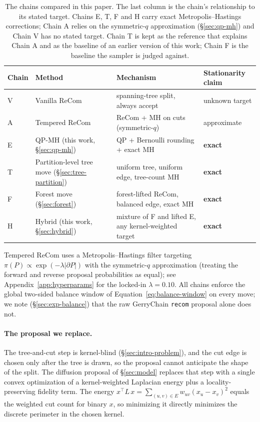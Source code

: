 \documentclass[11pt]{article}
\begin{document}
\begin{table}[htbp]
\centering
\footnotesize
\begin{tabular}{llll}
\toprule
Chain & Method & Mechanism & Stationarity claim \\
\midrule
V & Vanilla ReCom~\cite{deford2021recombination} & spanning-tree split, always accept & unknown target \\
A & Tempered ReCom & ReCom + MH on cuts (symmetric-$q$) & approximate \\
E & QP-MH (this work, \S\ref{sec:qp-mh}) & QP + Bernoulli rounding + exact MH & \textbf{exact} \\
T & Partition-level tree move (\S\ref{sec:tree-partition}) & uniform tree, uniform edge, tree-count MH & \textbf{exact} \\
F & Forest move (\S\ref{sec:forest}) & forest-lifted ReCom, balanced edge, exact MH & \textbf{exact} \\
H & Hybrid (this work, \S\ref{sec:hybrid}) & mixture of F and lifted E, any kernel-weighted target & \textbf{exact} \\
\bottomrule
\end{tabular}
\caption{The chains compared in this paper. The last column is the
  chain's relationship to its stated target. Chains E, T, F and H carry
  exact Metropolis--Hastings corrections; Chain A relies on the
  symmetric-$q$ approximation (\S\ref{sec:qp-mh}) and Chain V has
  no stated target. Chain T is kept as the reference that explains
  Chain A and as the baseline of an earlier version of this work;
  Chain F is the baseline the sampler is judged against.}
\label{tab:chains}
\end{table}

Tempered ReCom uses a Metropolis--Hastings filter targeting
$\pi(P) \propto \exp(-\lambda |\partial P|)$ with the symmetric-$q$
approximation (treating the forward and reverse proposal probabilities
as equal); see Appendix~\ref{app:hyperparams} for the locked-in
$\lambda = 0.10$. All chains enforce the global
two-sided balance window of Equation~\eqref{eq:balance-window} on
every move; we note (\S\ref{sec:exp-balance}) that the raw GerryChain
\texttt{recom} proposal alone does not.

\paragraph{The proposal we replace.}\label{sec:background-weakness}
The tree-and-cut step is kernel-blind (\S\ref{sec:intro-problem}),
and the cut edge is chosen only after the tree is drawn, so the
proposal cannot anticipate the shape of the split. The diffusion
proposal of \S\ref{sec:model} replaces that step with a single convex
optimization of a kernel-weighted Laplacian energy plus a
locality-preserving fidelity term. The energy
$x^\top L\, x = \sum_{(u,v) \in E} w_{uv} (x_u - x_v)^2$ equals the
weighted cut count for binary $x$, so minimizing it directly
minimizes the discrete perimeter in the chosen kernel.
\end{document}
